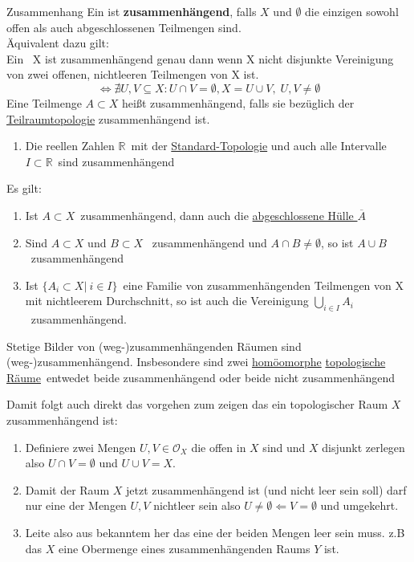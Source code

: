\begin{titleDef}{Zusammenhang}
\label{zusammenhang}
Ein \Toporeflong \Topo ist \textbf{zusammenhängend}, falls $X$ und $\emptyset$ die einzigen sowohl offen als auch abgeschlossenen Teilmengen sind.\\
Äquivalent dazu gilt: \\
Ein \Toporeflong~X ist zusammenhängend genau dann wenn X nicht disjunkte Vereinigung von zwei offenen, nichtleeren Teilmengen von X ist.\\
$$\Longleftrightarrow\nexists U,V\subseteq X:U\cap V=\emptyset, X=U\cup V, \;U,V\neq\emptyset$$
Eine Teilmenge $A\subset X$ heißt zusammenhängend, falls sie bezüglich der \hyperref[teilraumTopo]{Teilraumtopologie} zusammenhängend ist.
\listbsp
\begin{enumerate}
    \item Die reellen Zahlen $\mathbb{R}$~mit der \hyperref[stdTopo]{Standard-Topologie} und auch alle Intervalle $I\subset\mathbb{R}$~sind zusammenhängend
\end{enumerate}
Es gilt:
\begin{enumerate}
    \item Ist $A\subset X$~zusammenhängend, dann auch die \hyperref[abhuelle]{abgeschlossene Hülle }$\overline{A}$
    \item Sind $A\subset X$ und $B\subset X$ ~zusammenhängend und $A\cap B\neq\emptyset$, so ist $A\cup B$~zusammenhängend
    \item Ist $\{A_i\subset X|\ i\in I\}$~eine Familie von zusammenhängenden Teilmengen von X mit nichtleerem Durchschnitt, so ist auch die Vereinigung $\bigcup_{i\in I}A_i$~zusammenhängend.
\end{enumerate}
Stetige Bilder von (weg-)zusammenhängenden Räumen sind (weg-)zusammenhängend. Insbesondere sind zwei \hyperref[homoemorph]{homöomorphe} \hyperref[Topologie]{topologische Räume}~entwedet beide zusammenhängend oder beide nicht zusammenhängend\par
Damit folgt auch direkt das vorgehen zum zeigen das ein topologischer Raum $X$ zusammenhängend ist:
\begin{enumerate}
	\item Definiere zwei Mengen $U,V\in\mathcal{O}_X$ die offen in $X$ sind und $X$ disjunkt zerlegen also $U\cap V=\emptyset$ und $U\cup V=X$.
	\item Damit der Raum $X$ jetzt zusammenhängend ist (und nicht leer sein soll) darf nur eine der Mengen $U,V$ nichtleer sein also $U\neq\emptyset\Leftarrow V=\emptyset$ und umgekehrt.
	\item Leite also aus bekanntem her das eine der beiden Mengen leer sein muss. z.B das $X$ eine Obermenge eines zusammenhängenden Raums $Y$ ist.

\end{enumerate}
\end{titleDef}

